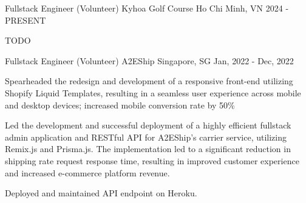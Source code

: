 \begin{cventries}
  \cventry
  {Fullstack Engineer (Volunteer)} %
  {Kyhoa Golf Course} %
  {Ho Chi Minh, VN}
  {2024 - PRESENT}
  {
    \begin{cvitems} %
    \item TODO
    \end{cvitems}
  }
  
  \cventry
  {Fullstack Engineer (Volunteer)} %
  {A2EShip} %
  {Singapore, SG}
  {Jan, 2022 - Dec, 2022}
  {
    \begin{cvitems} %
      \item {Spearheaded the redesign and development of a responsive front-end utilizing Shopify Liquid Templates, resulting in a seamless user experience across mobile and desktop devices; increased mobile conversion rate by 50\%}
      \item {Led the development and successful deployment of a highly efficient fullstack admin application and RESTful API for A2EShip's carrier service, utilizing Remix.js and Prisma.js. The implementation led to a significant reduction in shipping rate request response time, resulting in improved customer experience and increased e-commerce platform revenue.}
      \item {Deployed and maintained API endpoint on Heroku.}
    \end{cvitems}
  }
\end{cventries}
